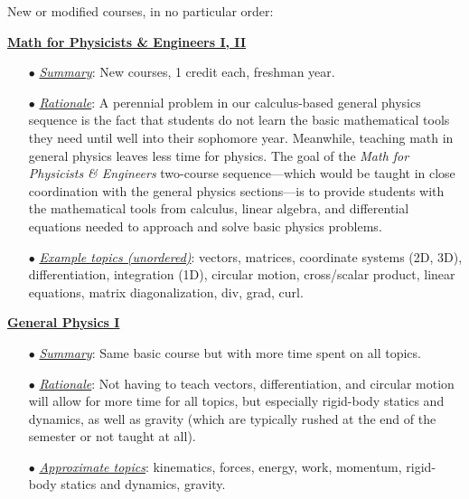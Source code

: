 \documentclass[12pt,preprint]{aastex}
\begin{document}
New or modified courses, in no particular order:
\begin{itemize*}
\item{\underline{\bf Math for Physicists \& Engineers I, II}
  \begin{itemize}
    \item[$\bullet$]{\underline{\em Summary}: New courses, 1 credit each,
      freshman year.}
    \item[$\bullet$]{\underline{\em Rationale}: A perennial problem in our
      calculus-based general physics sequence is the fact that students do not
      learn the basic mathematical tools they need until well into their
      sophomore year.  Meanwhile, teaching math in general physics leaves less
      time for physics.  The goal of the {\em Math for Physicists \& Engineers}
      two-course sequence---which would be taught in close coordination with the
      general physics sections---is to provide students with the mathematical
      tools from calculus, linear algebra, and differential equations needed to
      approach and solve basic physics problems.}
    \item[$\bullet$]{\underline{\em Example topics (unordered)}: vectors,
      matrices, coordinate systems (2D, 3D), differentiation, integration (1D),
      circular motion, cross/scalar product, linear equations, matrix
      diagonalization, div, grad, curl.}
  \end{itemize}
}
\item{\underline{{\bf General Physics I}}
  \begin{itemize}
    \item[$\bullet$]{\underline{\em Summary}: Same basic course but with more
      time spent on all topics.}
    \item[$\bullet$]{\underline{\em Rationale}: Not having to teach vectors,
      differentiation, and circular motion will allow for more time for all
      topics, but especially rigid-body statics and dynamics, as well as gravity
      (which are typically rushed at the end of the semester or not taught at
      all).}
    \item[$\bullet$]{\underline{\em Approximate topics}: kinematics, forces,
      energy, work, momentum, rigid-body statics and dynamics, gravity.}
  \end{itemize}
}
  

\end{itemize*}
\end{document}
